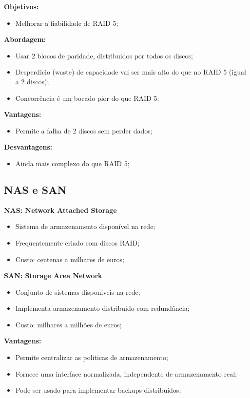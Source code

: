 \documentclass{article}
\begin{document}
\begin{flushleft}
  \textbf{Objetivos:}
  \begin{itemize}
    \item Melhorar a fiabilidade de RAID 5;
  \end{itemize}

  \textbf{Abordagem:}
  \begin{itemize}
    \item Usar 2 blocos de paridade, distribuidos por todos os discos;
    \item Desperdicio (waste) de capacidade vai ser mais alto do que no RAID 5 (igual a 2 discos);
    \item Concorrência é um bocado pior do que RAID 5;
  \end{itemize}

  \textbf{Vantagens:}
  \begin{itemize}
    \item Permite a falha de 2 discos sem perder dados;
  \end{itemize}

  \textbf{Desvantagens:}
  \begin{itemize}
    \item Ainda mais complexo do que RAID 5;
  \end{itemize}
\end{flushleft}

\subsection{NAS e SAN}

\begin{flushleft}
  \textbf{NAS: Network Attached Storage}
  \begin{itemize}
    \item Sistema de armazenamento disponível na rede;
    \item Frequentemente criado com discos RAID;
    \item Custo: centenas a milhares de euros;
  \end{itemize}

  \textbf{SAN: Storage Area Network}
  \begin{itemize}
    \item Conjunto de sistemas disponiveis na rede;
    \item Implementa armazenamento distribuido com redundância;
    \item Custo: milhares a milhões de euros;
  \end{itemize}

  \textbf{Vantagens:}
  \begin{itemize}
    \item Permite centralizar as politicas de armazenamento;
    \item Fornece uma interface normalizada, independente de armazenamento real;
    \item Pode ser usado para implementar backups distribuidos;
  \end{itemize}
\end{flushleft}

\pagebreak
\end{document}
